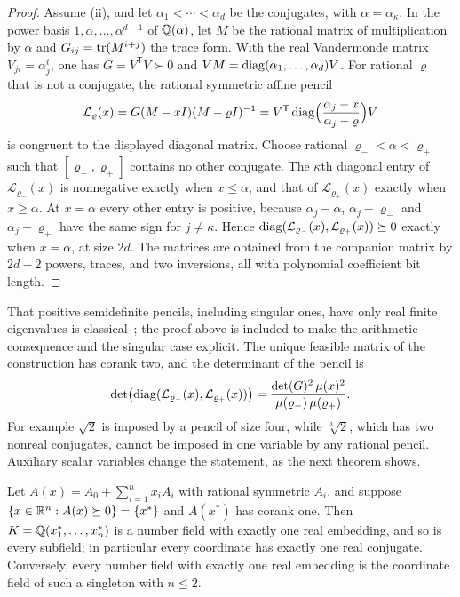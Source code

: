 \begin{proof}
Assume (ii), and let $\alpha_1<\cdots<\alpha_d$ be the conjugates, with
$\alpha=\alpha_\kappa$. In the power basis $1,\alpha,\ldots,\alpha^{d-1}$ of
$\mathbb Q(\alpha)$, let $M$ be the rational matrix of multiplication by $\alpha$ and
$G_{ij}=\operatorname{tr}(M^{i+j})$ the trace form. With the real Vandermonde matrix
$V_{ji}=\alpha_j^i$, one has $G=V^{\mathsf T}V\succ0$ and
$VM=\operatorname{diag}(\alpha_1,\ldots,\alpha_d)V$. For rational $\varrho$ that is not a
conjugate, the rational symmetric affine pencil
\[
\mathcal L_\varrho(x)=G(M-xI)(M-\varrho I)^{-1}
=V^{\mathsf T}\operatorname{diag}\Bigl(\frac{\alpha_j-x}{\alpha_j-\varrho}\Bigr)V
\]
is congruent to the displayed diagonal matrix. Choose rational
$\varrho_-<\alpha<\varrho_+$ such that $[\varrho_-,\varrho_+]$ contains no other
conjugate. The $\kappa$th diagonal entry of $\mathcal L_{\varrho_-}(x)$ is
nonnegative exactly when $x\le\alpha$, and that of $\mathcal L_{\varrho_+}(x)$
exactly when $x\ge\alpha$. At $x=\alpha$ every other entry is positive,
because $\alpha_j-\alpha$, $\alpha_j-\varrho_-$ and $\alpha_j-\varrho_+$ have
the same sign for $j\ne\kappa$. Hence
$\operatorname{diag}(\mathcal L_{\varrho_-}(x),\mathcal L_{\varrho_+}(x))\succeq0$ exactly
when $x=\alpha$, at size $2d$. The matrices are obtained from the companion
matrix by $2d-2$ powers, traces, and two inversions, all with polynomial
coefficient bit length.
\end{proof}

That positive semidefinite pencils, including singular ones, have only real
finite eigenvalues is classical~\cite{LiangLiBai2013}; the proof above is
included to make the arithmetic consequence and the singular case explicit.
The unique feasible matrix of the construction has corank two, and the
determinant of the pencil is
\[
\det\bigl(\operatorname{diag}(\mathcal L_{\varrho_-}(x),\mathcal L_{\varrho_+}(x))\bigr)
=\frac{\det(G)^2\,\mu(x)^2}{\mu(\varrho_-)\,\mu(\varrho_+)} .
\]
For
example $\sqrt2$ is imposed by a pencil of size four, while $\sqrt[3]2$, which
has two nonreal conjugates, cannot be imposed in one variable by any rational
pencil. Auxiliary scalar variables change the statement, as the next theorem
shows.

\begin{theorem}
\label{thm:qc-corank-one}
Let $A(x)=A_0+\sum_{i=1}^nx_iA_i$ with rational symmetric $A_i$, and suppose
$\{x\in\mathbb R^n:A(x)\succeq0\}=\{x^*\}$ and $A(x^*)$ has corank one. Then
$K=\mathbb Q(x_1^*,\ldots,x_n^*)$ is a number field with exactly one real embedding,
and so is every subfield; in particular every coordinate has exactly one real
conjugate. Conversely, every number field with exactly one real embedding is
the coordinate field of such a singleton with $n\le2$.
\end{theorem}


